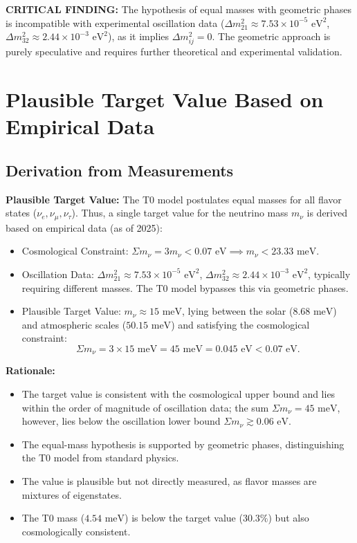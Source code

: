 	\begin{warning}
		\textbf{CRITICAL FINDING:} The hypothesis of equal masses with geometric phases is incompatible with experimental oscillation data (\(\Delta m^2_{21} \approx 7.53 \times 10^{-5} \text{ eV}^2\), \(\Delta m^2_{32} \approx 2.44 \times 10^{-3} \text{ eV}^2\)), as it implies \(\Delta m^2_{ij} = 0\). The geometric approach is purely speculative and requires further theoretical and experimental validation.
	\end{warning}
	
	\section{Plausible Target Value Based on Empirical Data}
	
	\subsection{Derivation from Measurements}
	
	\begin{experimental}
		\textbf{Plausible Target Value:}
		The T0 model postulates equal masses for all flavor states (\(\nu_e, \nu_\mu, \nu_\tau\)). Thus, a single target value for the neutrino mass \(m_\nu\) is derived based on empirical data (as of 2025):
		\begin{itemize}
			\item Cosmological Constraint: \(\Sigma m_\nu = 3 m_\nu < 0.07 \text{ eV} \implies m_\nu < 23.33 \text{ meV}\).
			\item Oscillation Data: \(\Delta m^2_{21} \approx 7.53 \times 10^{-5} \text{ eV}^2\), \(\Delta m^2_{32} \approx 2.44 \times 10^{-3} \text{ eV}^2\), typically requiring different masses. The T0 model bypasses this via geometric phases.
			\item Plausible Target Value: \(m_\nu \approx 15 \text{ meV}\), lying between the solar (\(8.68 \text{ meV}\)) and atmospheric scales (\(50.15 \text{ meV}\)) and satisfying the cosmological constraint:
			\[
			\Sigma m_\nu = 3 \times 15 \text{ meV} = 45 \text{ meV} = 0.045 \text{ eV} < 0.07 \text{ eV}.
			\]
		\end{itemize}
		
		\textbf{Rationale:}
		\begin{itemize}
			\item The target value is consistent with the cosmological upper bound and lies within the order of magnitude of oscillation data; the sum \(\Sigma m_\nu = 45 \text{ meV}\), however, lies below the oscillation lower bound \(\Sigma m_\nu \gtrsim 0.06 \text{ eV}\).
			\item The equal-mass hypothesis is supported by geometric phases, distinguishing the T0 model from standard physics.
			\item The value is plausible but not directly measured, as flavor masses are mixtures of eigenstates.
			\item The T0 mass (\(4.54 \text{ meV}\)) is below the target value (\(30.3\%\)) but also cosmologically consistent.
		\end{itemize}
	\end{experimental}
	
